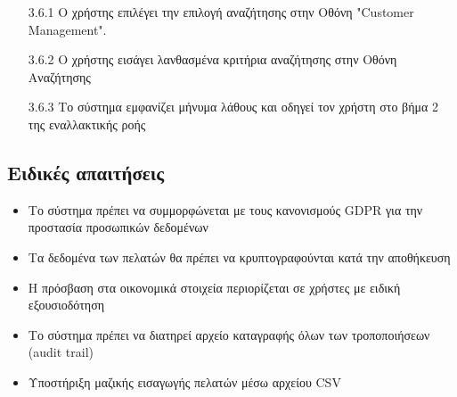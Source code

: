 \documentclass[12pt,a4paper,twoside]{book}
\begin{document}
\begin{enumerate}
        \begin{enumerate}
          \item[3.6.1 ] Ο χρήστης επιλέγει την επιλογή αναζήτησης στην Οθόνη "Customer Management". %
          \item[3.6.2 ] Ο χρήστης εισάγει λανθασμένα κριτήρια αναζήτησης στην Οθόνη Αναζήτησης
          \item[3.6.3 ] Το σύστημα εμφανίζει μήνυμα λάθους και οδηγεί τον χρήστη στο βήμα 2 της εναλλακτικής ροής %
        \end{enumerate}
\end{enumerate}

\subsection{Ειδικές απαιτήσεις} %
\begin{itemize}
  \item Το σύστημα πρέπει να συμμορφώνεται με τους κανονισμούς GDPR για την προστασία προσωπικών δεδομένων %
  \item Τα δεδομένα των πελατών θα πρέπει να κρυπτογραφούνται κατά την αποθήκευση %
  \item Η πρόσβαση στα οικονομικά στοιχεία περιορίζεται σε χρήστες με ειδική εξουσιοδότηση %
  \item Το σύστημα πρέπει να διατηρεί αρχείο καταγραφής όλων των τροποποιήσεων (audit trail) %
  \item Υποστήριξη μαζικής εισαγωγής πελατών μέσω αρχείου CSV
\end{itemize}
\end{document}
